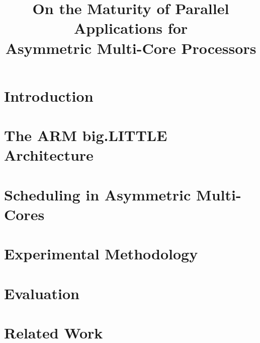 \documentclass{sig-alternate}
\begin{document}
\title{On the Maturity of Parallel Applications for \\ Asymmetric Multi-Core 
Processors}

\author{}

\maketitle
\thispagestyle{firstpage}
\pagestyle{plain}

\begin{abstract}

\end{abstract}

\maketitle


\section{Introduction}
\label{sec:intro}



\section{The ARM big.LITTLE Architecture}
\label{sec:background}\label{sec:suitability}


\section{Scheduling in Asymmetric Multi-Cores}
\label{sec:scheduling}


\section{Experimental Methodology}
\label{sec:experimental}


\section{Evaluation}
\label{sec:evaluation}


\section{Related Work}
\label{sec:related}

\end{document}
